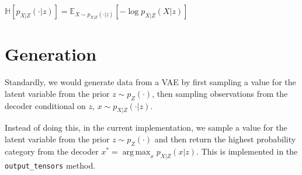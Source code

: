 \documentclass[11pt]{article}
\DeclareMathOperator*{\argmax}{arg\,max}
\begin{document}
\(\mathbb{H}[p_{X|Z}(\cdot|z)]=\mathbb{E}_{X\sim p_{X|Z}(\cdot|z)}[-\log p_{X|Z}(X|z)]\)




\section{Generation}
\label{sec:org872d92b}
Standardly, we would generate data from a VAE by first sampling a value for the latent variable from the prior \(z\sim p_{Z}(\cdot)\), then sampling observations from 
the decoder conditional on \(z\), \(x\sim p_{X|Z}(\cdot|z)\).

Instead of doing this, in the current implementation, we sample a value for the latent variable from the prior \(z\sim p_{Z}(\cdot)\)  and then return the highest probability category from the decoder
 \(x^* = \argmax_{x} p_{X|Z}(x|z)\). This is implemented in the \texttt{output\_tensors} method.
\end{document}
